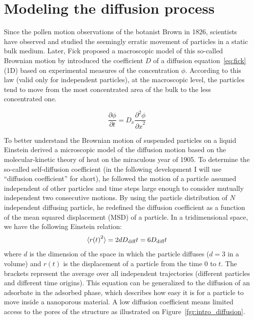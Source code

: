 \documentclass[main]{subfiles}
\begin{document}
\section{Modeling the diffusion process}

Since the pollen motion observations of the botanist Brown in 1826, scientists have observed and studied the seemingly erratic movement of particles in a static bulk medium. Later, Fick proposed a macroscopic model of this so-called Brownian motion by introduced the coefficient $D$ of a diffusion equation~\ref{eq:fick} (1D) based on experimental measures of the concentration $\phi$.\autocite{Fick_1855} According to this law (valid only for independent particles), at the macroscopic level, the particles tend to move from the most concentrated area of the bulk to the less concentrated one. 

\begin{equation}\label{eq:fick}
  \frac{\partial \phi}{\partial t} = D_x \frac{\partial^2 \phi}{{\partial x}^2}
\end{equation}

To better understand the Brownian motion of suspended particles on a liquid Einstein derived a microscopic model of the diffusion motion based on the molecular-kinetic theory of heat on the miraculous year of 1905.\autocite{einstein1905motion} To determine the so-called self-diffusion coefficient (in the following development I will use ``diffusion coefficient'' for short), he followed the motion of a particle assumed independent of other particles and time steps large enough to consider mutually independent two consecutive motions. By using the particle distribution of $N$ independent diffusing particle, he redefined the diffusion coefficient as a function of the mean squared displacement (MSD) of a particle. In a tridimensional space, we have the following Einstein relation:
\begin{equation}\label{eq:einstein}
  \langle {r(t)}^2 \rangle = 2dD_{\text{diff}}t = 6D_{\text{diff}}t
\end{equation}
where  $d$ is the dimension of the space in which the particle diffuses ($d=3$ in a volume) and $r(t)$ is the displacement of a particle from the time $0$ to $t$. The brackets represent the average over all independent trajectories (different particles and different time origins). This equation can be generalized to the diffusion of an adsorbate in the adsorbed phase, which describes how easy it is for a particle to move inside a nanoporous material. A low diffusion coefficient means limited access to the pores of the structure as illustrated on Figure~\ref{fgr:intro_diffusion}.
\end{document}
